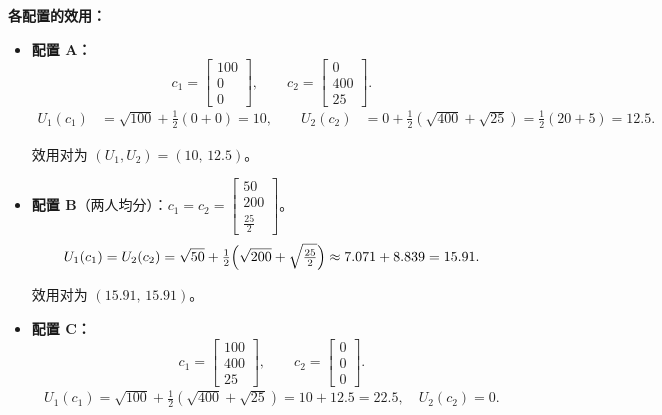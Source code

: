 \begin{tcolorbox}[example]
\begin{solution}[blank-type=manual,blank-vsep=5\baselineskip]
        \textbf{各配置的效用：}
        \begin{itemize}
            \item \textbf{配置 A：}
            \[
                c_1=\begin{bmatrix}100 \\ 0 \\ 0\end{bmatrix},\qquad
                c_2=\begin{bmatrix}0 \\ 400 \\ 25\end{bmatrix}.
            \]
            \[
                \begin{aligned}
                    U_1(c_1) &= \sqrt{100}+\tfrac12(0+0)=10,\qquad
                    U_2(c_2) &= 0+\tfrac12(\sqrt{400}+\sqrt{25})
                    =\tfrac12(20+5)=12.5.
                \end{aligned}
            \]

            效用对为 $(U_1,U_2)=(10,\,12.5)$。

            \item \textbf{配置 B}（两人均分）：$c_1=c_2=
            \begin{bmatrix}50 \\ 200 \\ \tfrac{25}{2}\end{bmatrix}$。
            \[
                U_1(c_1)=U_2(c_2)=\sqrt{50}+\tfrac12\Bigl(\sqrt{200}+\sqrt{\tfrac{25}{2}}\Bigr)
                \approx 7.071+8.839=15.91.
            \]

            效用对为 $(15.91,\,15.91)$。

            \item \textbf{配置 C：}
            \[
                c_1=\begin{bmatrix}100 \\ 400 \\ 25\end{bmatrix},\qquad
                c_2=\begin{bmatrix}0 \\ 0 \\ 0\end{bmatrix}.
            \]
            \[
                \begin{aligned}
                    U_1(c_1) = \sqrt{100}+\tfrac12(\sqrt{400}+\sqrt{25})=10+12.5=22.5, \quad
                    U_2(c_2) = 0.
                \end{aligned}
            \]


\end{itemize}
\end{solution}
\end{tcolorbox}
